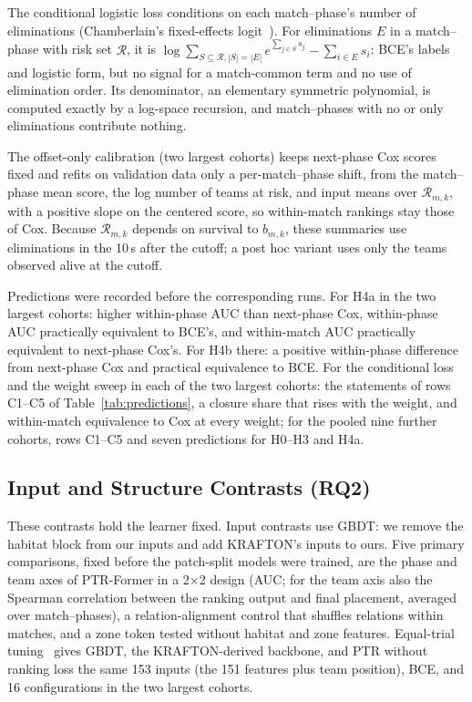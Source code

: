 \documentclass[sigconf,anonymous]{acmart}
\begin{document}
The conditional logistic loss conditions on each match--phase's number of eliminations (Chamberlain's fixed-effects logit~\cite{Chamberlain80}). For eliminations $E$ in a match--phase with risk set $\mathcal{R}$, it is $\log\sum_{S\subseteq\mathcal{R},|S|=|E|}e^{\sum_{j\in S}s_j}-\sum_{i\in E}s_i$: BCE's labels and logistic form, but no signal for a match-common term and no use of elimination order. Its denominator, an elementary symmetric polynomial, is computed exactly by a log-space recursion, and match--phases with no or only eliminations contribute nothing.

The offset-only calibration (two largest cohorts) keeps next-phase Cox scores fixed and refits on validation data only a per-match--phase shift, from the match--phase mean score, the log number of teams at risk, and input means over $\mathcal{R}_{m,k}$, with a positive slope on the centered score, so within-match rankings stay those of Cox. Because $\mathcal{R}_{m,k}$ depends on survival to $b_{m,k}$, these summaries use eliminations in the 10\,s after the cutoff; a post hoc variant uses only the teams observed alive at the cutoff.

Predictions were recorded before the corresponding runs. For H4a in the two largest cohorts: higher within-phase AUC than next-phase Cox, within-phase AUC practically equivalent to BCE's, and within-match AUC practically equivalent to next-phase Cox's. For H4b there: a positive within-phase difference from next-phase Cox and practical equivalence to BCE. For the conditional loss and the weight sweep in each of the two largest cohorts: the statements of rows C1--C5 of Table~\ref{tab:predictions}, a closure share that rises with the weight, and within-match equivalence to Cox at every weight; for the pooled nine further cohorts, rows C1--C5 and seven predictions for H0--H3 and H4a.

\subsection{Input and Structure Contrasts (RQ2)}
\label{sec:method:contrasts}
These contrasts hold the learner fixed. Input contrasts use GBDT: we remove the habitat block from our inputs and add KRAFTON's inputs to ours. Five primary comparisons, fixed before the patch-split models were trained, are the phase and team axes of PTR-Former in a 2$\times$2 design (AUC; for the team axis also the Spearman correlation between the ranking output and final placement, averaged over match--phases), a relation-alignment control that shuffles relations within matches, and a zone token tested without habitat and zone features. Equal-trial tuning~\cite{Bergstra12,Cawley10} gives GBDT, the KRAFTON-derived backbone, and PTR without ranking loss the same 153 inputs (the 151 features plus team position), BCE, and 16 configurations in the two largest cohorts.
\end{document}
